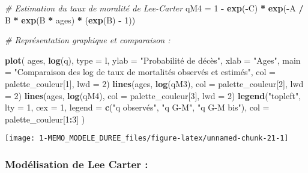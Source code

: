 \documentclass[
]{article}
\newenvironment{Shaded}{\begin{snugshade}}{\end{snugshade}}
\newcommand{\AttributeTok}[1]{\textcolor[rgb]{0.13,0.29,0.53}{#1}}
\newcommand{\CommentTok}[1]{\textcolor[rgb]{0.56,0.35,0.01}{\textit{#1}}}
\newcommand{\DecValTok}[1]{\textcolor[rgb]{0.00,0.00,0.81}{#1}}
\newcommand{\FunctionTok}[1]{\textcolor[rgb]{0.13,0.29,0.53}{\textbf{#1}}}
\newcommand{\NormalTok}[1]{#1}
\newcommand{\OtherTok}[1]{\textcolor[rgb]{0.56,0.35,0.01}{#1}}
\newcommand{\SpecialCharTok}[1]{\textcolor[rgb]{0.81,0.36,0.00}{\textbf{#1}}}
\newcommand{\StringTok}[1]{\textcolor[rgb]{0.31,0.60,0.02}{#1}}
\begin{document}
\begin{Shaded}
\begin{Highlighting}[]
\CommentTok{\# Estimation du taux de moralité de Lee{-}Carter }
\NormalTok{qM4 }\OtherTok{=} \DecValTok{1} \SpecialCharTok{{-}} \FunctionTok{exp}\NormalTok{(}\SpecialCharTok{{-}}\NormalTok{C) }\SpecialCharTok{*} \FunctionTok{exp}\NormalTok{(}\SpecialCharTok{{-}}\NormalTok{A }\SpecialCharTok{/}\NormalTok{ B }\SpecialCharTok{*} \FunctionTok{exp}\NormalTok{(B }\SpecialCharTok{*}\NormalTok{ ages) }\SpecialCharTok{*}\NormalTok{ (}\FunctionTok{exp}\NormalTok{(B) }\SpecialCharTok{{-}} \DecValTok{1}\NormalTok{))}


\CommentTok{\# Représentation graphique et comparaison : }

\FunctionTok{plot}\NormalTok{(}
\NormalTok{  ages,}
  \FunctionTok{log}\NormalTok{(q),}
  \AttributeTok{type =} \StringTok{\textquotesingle{}l\textquotesingle{}}\NormalTok{,}
  \AttributeTok{ylab =} \StringTok{"Probabilité de décès"}\NormalTok{,}
  \AttributeTok{xlab =} \StringTok{"Ages"}\NormalTok{,}
  \AttributeTok{main =} \StringTok{"Comparaison des log de taux de mortalités observés et estimés"}\NormalTok{,}
  \AttributeTok{col =}\NormalTok{ palette\_couleur[}\DecValTok{1}\NormalTok{],}
  \AttributeTok{lwd =} \DecValTok{2}\NormalTok{)}
\FunctionTok{lines}\NormalTok{(ages, }\FunctionTok{log}\NormalTok{(qM3), }\AttributeTok{col =}\NormalTok{ palette\_couleur[}\DecValTok{2}\NormalTok{], }\AttributeTok{lwd =} \DecValTok{2}\NormalTok{)}
\FunctionTok{lines}\NormalTok{(ages, }\FunctionTok{log}\NormalTok{(qM4), }\AttributeTok{col =}\NormalTok{ palette\_couleur[}\DecValTok{3}\NormalTok{], }\AttributeTok{lwd =} \DecValTok{2}\NormalTok{)}
\FunctionTok{legend}\NormalTok{(}\StringTok{"topleft"}\NormalTok{,}
  \AttributeTok{lty =} \DecValTok{1}\NormalTok{,}
  \AttributeTok{cex =} \DecValTok{1}\NormalTok{,}
  \AttributeTok{legend =} \FunctionTok{c}\NormalTok{(}\StringTok{"q observés"}\NormalTok{, }\StringTok{"q G{-}M"}\NormalTok{, }\StringTok{"q G{-}M bis"}\NormalTok{),}
  \AttributeTok{col =}\NormalTok{ palette\_couleur[}\DecValTok{1}\SpecialCharTok{:}\DecValTok{3}\NormalTok{]}
\NormalTok{)}
\end{Highlighting}
\end{Shaded}

\begin{center}\texttt{[image: 1-MEMO\_MODELE\_DUREE\_files/figure-latex/unnamed-chunk-21-1]} \end{center}

\hypertarget{moduxe9lisation-de-lee-carter}{%
\subsubsection{Modélisation de Lee Carter
:}\label{moduxe9lisation-de-lee-carter}}
\end{document}
